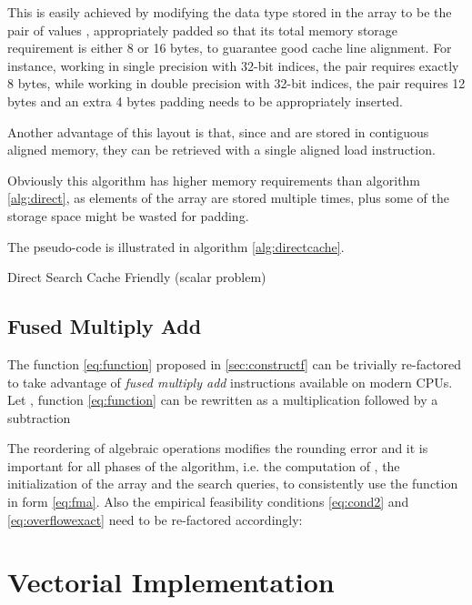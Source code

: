 \documentclass[preprint,1p,times]{elsarticle}
\begin{document}
This is easily achieved by modifying the data type stored in the array  to be the pair of values , appropriately padded so that its total memory storage requirement is either 8 or 16 bytes, to guarantee good cache line alignment. For instance, working in single precision with 32-bit indices, the pair requires exactly 8 bytes, while working in double precision with 32-bit indices, the pair requires 12 bytes and an extra 4 bytes padding needs to be appropriately inserted.

Another advantage of this layout is that, since  and  are stored in contiguous aligned memory, they can be retrieved with a single aligned load instruction.

Obviously this algorithm has higher memory requirements than algorithm \ref{alg:direct}, as elements of the array  are stored multiple times, plus some of the storage space might be wasted for padding.

The pseudo-code is illustrated in algorithm \ref{alg:directcache}.

\begin{algorithm}
	\caption{Direct Search Cache Friendly (scalar problem)}
	\label{alg:directcache}
	\begin{algorithmic}
		\Function {\DirectCacheName}{\fin , , ,  \fout }
		\State 
		\State {} 
		\If {}
			\State  {}
		\EndIf
		\EndFunction
	\end{algorithmic}
\end{algorithm}

\subsection{Fused Multiply Add}
The function \eqref{eq:function} proposed in \ref{sec:constructf} can be trivially re-factored to take advantage of \textit{fused multiply add} instructions available on modern CPUs. Let , function \eqref{eq:function} can be rewritten as a multiplication followed by a subtraction

The reordering of algebraic operations modifies the rounding error and it is important for all phases of the algorithm, i.e. the computation of , the initialization of the array  and the search queries, to consistently use the function in form \eqref{eq:fma}. Also the empirical feasibility conditions \eqref{eq:cond2} and \eqref{eq:overflowexact} need to be re-factored accordingly:


\section{Vectorial Implementation}
\label{sec:vectorialimpl}
\end{document}

